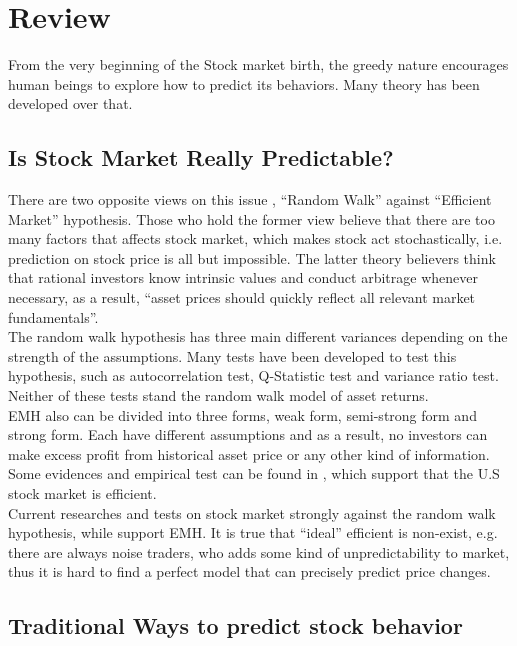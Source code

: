 \chapter{Review}

From the very beginning of the Stock market birth, the greedy nature encourages human beings to explore how to predict its behaviors. Many theory has been developed over that.

\section{Is Stock Market Really Predictable?}
There are two opposite views on this issue \cite{2_dalton_2001}, “Random Walk” against “Efficient Market” hypothesis. Those who hold the former view believe that there are too many factors that affects stock market, which makes stock act stochastically, i.e. prediction on stock price is all but impossible. The latter theory believers think that rational investors know intrinsic values and conduct arbitrage whenever necessary, as a result, “asset prices should quickly reflect all relevant market fundamentals”\cite{1_wong_1997}.\\

The random walk hypothesis has three main different variances depending on the strength of the assumptions\cite{1_shadbolttaylor_2002}. Many tests have been developed to test this hypothesis, such as autocorrelation test\cite{lo1988stock}, Q-Statistic test\cite{box1970distribution} and variance ratio test\cite{1_shadbolttaylor_2002}. Neither of these tests stand the random walk model of asset returns.\\

EMH also can be divided into three forms\cite{1_wong_1997}, weak form, semi-strong form and strong form. Each have different assumptions and as a result, no investors can make excess profit from historical asset price or any other kind of information. Some evidences and empirical test can be found in \cite{1_keane_1983}, which support that the U.S stock market is efficient.\\

Current researches and tests on stock market strongly against the random walk hypothesis, while support EMH. It is true that “ideal” efficient is non-exist, e.g. there are always noise traders\cite{de1990noise}, who adds some kind of unpredictability to market, thus it is hard to find a perfect model that can precisely predict price changes.

\section{Traditional Ways to predict stock behavior}

